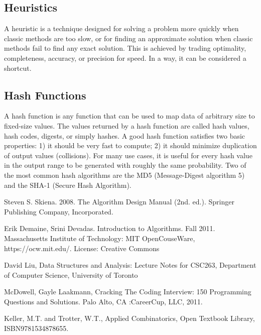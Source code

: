 \documentclass{article}
\begin{document}
    \subsection{Heuristics}
        A heuristic is a technique designed for solving a problem more quickly when classic methods are too slow, or for finding an approximate solution when classic methods fail to find any exact solution. This is achieved by trading optimality, completeness, accuracy, or precision for speed. In a way, it can be considered a shortcut.
    
    \subsection{Hash Functions}
        A hash function is any function that can be used to map data of arbitrary size to fixed-size values. The values returned by a hash function are called hash values, hash codes, digests, or simply hashes. 
        A good hash function satisfies two basic properties: 1) it should be very fast to compute; 2) it should minimize duplication of output values (collisions). For many use cases, it is useful for every hash value in the output range to be generated with roughly the same probability. Two of the most common hash algorithms are the MD5 (Message-Digest algorithm 5) and the SHA-1 (Secure Hash Algorithm).


\begin{thebibliography}{}
\bibitem{}
Steven S. Skiena. 2008. The Algorithm Design Manual (2nd. ed.). Springer Publishing Company, Incorporated.

\bibitem[]{}
Erik Demaine, Srini Devadas. Introduction to Algorithms. Fall 2011. Massachusetts Institute of Technology: MIT OpenCouseWare, https://ocw.mit.edu/. License: Creative Commons

\bibitem{}
David Liu, Data Structures and Analysis: Lecture Notes for CSC263, Department of Computer Science, University of Toronto

\bibitem{}
McDowell, Gayle Laakmann, Cracking The Coding Interview: 150 Programming Questions and Solutions. Palo Alto, CA :CareerCup, LLC, 2011.

\bibitem{}
Keller, M.T. and Trotter, W.T., Applied Combinatorics, Open Textbook Library, ISBN9781534878655.
\end{thebibliography}
\end{document}

